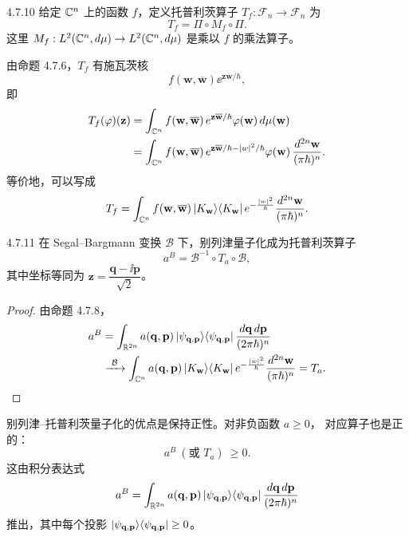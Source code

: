 \begin{definition}{4.7.10}
  给定 $\mathbb{C}^n$ 上的函数 $f$，定义托普利茨算子
  $T_f:\mathcal F_n\to\mathcal F_n$ 为
  \[
  T_f=\Pi\circ M_f\circ\Pi.
  \]
  这里 $M_f:L^2(\mathbb{C}^n,d\mu)\to L^2(\mathbb{C}^n,d\mu)$ 是乘以 $f$ 的乘法算子。
\end{definition}

由命题 4.7.6，$T_f$ 有施瓦茨核
\[
f(\mathbf w,\overline{\mathbf w})\ee^{\mathbf z\overline{\mathbf w}/\hbar},
\]
即
\begin{align*}
T_f(\varphi)(\mathbf z)
&=\int_{\mathbb{C}^n}f(\mathbf w,\overline{\mathbf w})\,
e^{\mathbf z\overline{\mathbf w}/\hbar}\varphi(\mathbf w)\,d\mu(\mathbf w)\\
&=\int_{\mathbb{C}^n}f(\mathbf w,\overline{\mathbf w})\,
e^{\mathbf z\overline{\mathbf w}/\hbar-|w|^2/\hbar}\varphi(\mathbf w)\,
\frac{d^{2n}\mathbf w}{(\pi\hbar)^n}.
\end{align*}
等价地，可以写成
\[
T_f=\int_{\mathbb{C}^n}f(\mathbf w,\overline{\mathbf w})\,
|K_{\mathbf w}\rangle\langle K_{\mathbf w}|\,
e^{-\frac{|w|^2}{\hbar}}\frac{d^{2n}\mathbf w}{(\pi\hbar)^n}.
\]

\begin{theorem}{4.7.11}
  在 Segal–Bargmann 变换 $\mathcal B$ 下，别列津量子化成为托普利茨算子
  \[
  a^B=\mathcal B^{-1}\circ T_a\circ\mathcal B,
  \]
  其中坐标等同为 $\mathbf z=\dfrac{\mathbf q-\ii\mathbf p}{\sqrt2}$。
\end{theorem}

\begin{proof}
由命题 4.7.8，
\begin{align*}
a^B&=\int_{\mathbb{R}^{2n}}a(\mathbf q,\mathbf p)\,
|\psi_{\mathbf q,\mathbf p}\rangle\langle \psi_{\mathbf q,\mathbf p}|\,
\frac{d\mathbf q\,d\mathbf p}{(2\pi\hbar)^n}\\
&\xrightarrow{\ \mathcal B\ }
\int_{\mathbb{C}^n}a(\mathbf q,\mathbf p)\,
|K_{\mathbf w}\rangle\langle K_{\mathbf w}|\,
e^{-\frac{|w|^2}{\hbar}}\frac{d^{2n}\mathbf w}{(\pi\hbar)^n}=T_a.
\end{align*}
\end{proof}

别列津–托普利茨量子化的优点是保持正性。对非负函数 $a\ge0$，
对应算子也是正的：
\[
a^B\ (\text{或 }T_a)\ \ge 0.
\]
这由积分表达式
\[
a^B=\int_{\mathbb{R}^{2n}}a(\mathbf q,\mathbf p)\,
|\psi_{\mathbf q,\mathbf p}\rangle\langle \psi_{\mathbf q,\mathbf p}|\,
\frac{d\mathbf q\,d\mathbf p}{(2\pi\hbar)^n}
\]
推出，其中每个投影
$|\psi_{\mathbf q,\mathbf p}\rangle\langle \psi_{\mathbf q,\mathbf p}|\ge0$。

